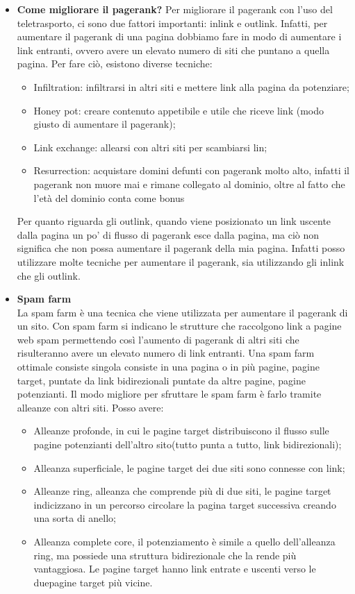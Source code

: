 \documentclass[10pt,                    %
               a4paper,                 %
               twoside,                 %
               openright,               %
               english,                 
               italian,                 
]{article}
\begin{document}
\begin{itemize}
\item \textbf{Come migliorare il pagerank?}
Per migliorare il pagerank con l'uso del teletrasporto, ci sono due fattori importanti:
inlink e outlink. Infatti, per aumentare il pagerank di una pagina dobbiamo fare in modo
di aumentare i link entranti, ovvero avere un elevato numero di siti che puntano a quella 
pagina. Per fare ciò, esistono diverse tecniche:
\begin{itemize}
\item Infiltration: infiltrarsi in altri siti e mettere link alla pagina da potenziare;
\item Honey pot: creare contenuto appetibile e utile che riceve link (modo giusto di aumentare
il pagerank);
\item Link exchange: allearsi con altri siti per scambiarsi lin;
\item Resurrection: acquistare domini defunti con pagerank molto alto, infatti il
pagerank non muore mai e rimane collegato al dominio, oltre al fatto che l'età del 
dominio conta come bonus
\end{itemize}
Per quanto riguarda gli outlink, quando viene posizionato un link uscente dalla pagina
un po' di flusso di pagerank esce dalla pagina, ma ciò non significa che non possa
aumentare il pagerank della mia pagina. Infatti posso utilizzare molte tecniche per
aumentare il pagerank, sia utilizzando gli inlink che gli outlink.



\item \textbf{Spam farm} \\
La spam farm è una tecnica che viene utilizzata per aumentare il pagerank 
di un sito. Con spam farm si indicano le strutture che raccolgono link a 
pagine web spam permettendo così l'aumento di pagerank di altri siti che 
risulteranno avere un elevato numero di link entranti. Una spam farm ottimale
consiste singola consiste in una pagina o in più pagine, pagine target, puntate 
da link bidirezionali puntate da altre pagine, pagine potenzianti. Il modo 
migliore per sfruttare le spam farm è farlo tramite alleanze con altri siti. Posso
avere:
\begin{itemize}
\item Alleanze profonde, in cui le pagine target distribuiscono il flusso sulle 
pagine potenzianti dell'altro sito(tutto punta a tutto, link bidirezionali);
\item Alleanza superficiale, le pagine target dei due siti sono connesse con link;
\item Alleanze ring, alleanza che comprende più di due siti, le pagine target 
indicizzano in un percorso circolare la pagina target successiva creando una sorta
di anello;
\item Alleanza complete core, il potenziamento è simile a quello dell'alleanza ring,
ma possiede una struttura bidirezionale che la rende più vantaggiosa. Le pagine target
hanno link entrate e uscenti verso le duepagine target più vicine.
\end{itemize}

\end{itemize}
\end{document}

